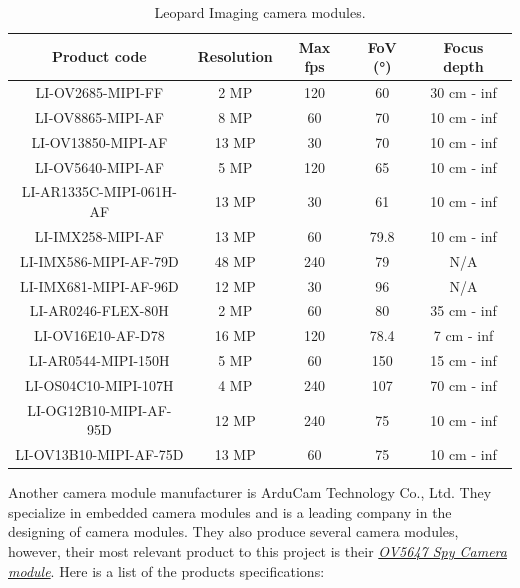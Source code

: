 \begin{table}[H]
    \centering
    \caption{Leopard Imaging camera modules.\citep{LI-P}}
    \begin{tabular}{|c|c|c|c|c|}
    \hline
        Product code & Resolution & Max fps & FoV (°) & Focus depth \\
    \hline
         LI-OV2685-MIPI-FF & 2 MP & 120 & 60 & 30 cm - inf  \\
    \hline 
        LI-OV8865-MIPI-AF & 8 MP & 60 & 70 & 10 cm - inf  \\
    \hline
        LI-OV13850-MIPI-AF & 13 MP & 30 & 70 & 10 cm - inf  \\
    \hline
        LI-OV5640-MIPI-AF & 5 MP & 120 & 65 & 10 cm - inf  \\
    \hline
        LI-AR1335C-MIPI-061H-AF & 13 MP & 30 & 61 & 10 cm - inf  \\
    \hline
        LI-IMX258-MIPI-AF & 13 MP & 60 & 79.8 & 10 cm - inf  \\
    \hline
        LI-IMX586-MIPI-AF-79D & 48 MP & 240 & 79 & N/A \\
    \hline
        LI-IMX681-MIPI-AF-96D & 12 MP & 30 & 96 & N/A  \\
    \hline
        LI-AR0246-FLEX-80H & 2 MP & 60 & 80 & 35 cm - inf  \\
    \hline 
        LI-OV16E10-AF-D78 & 16 MP & 120 & 78.4 & 7 cm - inf \\
    \hline
        LI-AR0544-MIPI-150H & 5 MP & 60 & 150 & 15 cm - inf \\
    \hline
        LI-OS04C10-MIPI-107H & 4 MP & 240 & 107 & 70 cm - inf\\
    \hline
        LI-OG12B10-MIPI-AF-95D & 12 MP & 240 & 75 & 10 cm - inf \\
    \hline
        LI-OV13B10-MIPI-AF-75D & 13 MP & 60 & 75 & 10 cm - inf \\
    \hline
        
    \end{tabular}
    
    \label{tab:Leopard Imaging camera modules}
\end{table}

\noindent Another camera module manufacturer is ArduCam Technology Co., Ltd. They specialize in embedded camera modules and is a leading company in the designing of camera modules. They also produce several camera modules, however, their most relevant product to this project is their \textit{\hyperref[fig:Arducam Spy Camera]{OV5647 Spy Camera module}}. Here is a list of the products specifications:

